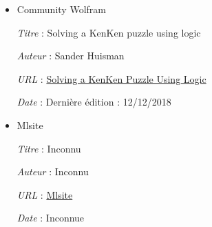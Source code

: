 \documentclass[1]{report}
\begin{document}
    \begin{itemize}

		\item Community Wolfram

			\emph{Titre} : Solving a KenKen puzzle using logic

			\emph{Auteur} : Sander Huisman

			\emph{URL} : \href{https://community.wolfram.com/groups/-/m/t/613040}{Solving a KenKen Puzzle Using Logic}

			\emph{Date} : Dernière édition : 12/12/2018 \\


        \item Mlsite

            \emph{Titre} : Inconnu

            \emph{Auteur} : Inconnu

            \emph{URL} : \href{http://www.mlsite.net/neknek/?fbclid=IwAR2uaILVfEVoqUzZFhEE7PmyQz7L9yb4JMFeXe8C8y4nL40hgjXXnMf4JCg}{Mlsite}

            \emph{Date} : Inconnue

    \end{itemize}
\end{document}
